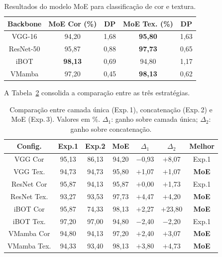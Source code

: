 \documentclass[conference]{IEEEtran}
\begin{document}
\begin{table}[htbp]
\caption{Resultados do modelo MoE para classifica\c{c}\~{a}o de cor e
         textura.}
\begin{center}
\begin{tabular}{c|c|c|c|c}
\hline
\textbf{Backbone} & \textbf{MoE Cor (\%)} & \textbf{DP}
                  & \textbf{MoE Tex. (\%)} & \textbf{DP} \\
\hline
VGG-16    & 94,20 & 1,68 & \textbf{95,80} & 1,63 \\
ResNet-50 & 95,87 & 0,88 & \textbf{97,73} & 0,65 \\
iBOT      & \textbf{98,13} & 0,69 & 94,80 & 1,17 \\
VMamba    & 97,20 & 0,45 & \textbf{98,13} & 0,62 \\
\hline
\end{tabular}
\label{tab_moe}
\end{center}
\end{table}

A Tabela~\ref{tab_comparacao} consolida a compara\c{c}\~{a}o entre as
tr\^{e}s estrat\'{e}gias.

\begin{table}[htbp]
\caption{Compara\c{c}\~{a}o entre camada \'{u}nica (Exp.\,1),
         concatena\c{c}\~{a}o (Exp.\,2) e MoE (Exp.\,3). Valores em \%.
         $\Delta_1$: ganho sobre camada \'{u}nica; $\Delta_2$: ganho
         sobre concatena\c{c}\~{a}o.}
\begin{center}
\begin{tabular}{c|c|c|c|c|c|c}
\hline
\textbf{Config.} & \textbf{Exp.1} & \textbf{Exp.2}
                 & \textbf{MoE} & \textbf{$\Delta_1$}
                 & \textbf{$\Delta_2$} & \textbf{Melhor} \\
\hline
VGG Cor    & 95,13 & 86,13 & 94,20 & $-$0,93 & $+$8,07  & Exp.1 \\
VGG Tex.   & 94,73 & 94,73 & 95,80 & $+$1,07 & $+$1,07  & \textbf{MoE} \\
ResNet Cor & 95,87 & 94,13 & 95,87 & $+$0,00 & $+$1,73  & Exp.1 \\
ResNet Tex.& 93,27 & 93,53 & 97,73 & $+$4,47 & $+$4,20  & \textbf{MoE} \\
iBOT Cor   & 95,87 & 74,33 & 98,13 & $+$2,27 & $+$23,80 & \textbf{MoE} \\
iBOT Tex.  & 97,20 & 97,00 & 94,80 & $-$2,40 & $-$2,20  & Exp.1 \\
VMamba Cor & 94,80 & 94,13 & 97,20 & $+$2,40 & $+$3,07  & \textbf{MoE} \\
VMamba Tex.& 94,33 & 93,40 & 98,13 & $+$3,80 & $+$4,73  & \textbf{MoE} \\
\hline
\end{tabular}
\label{tab_comparacao}
\end{center}
\end{table}
\end{document}
